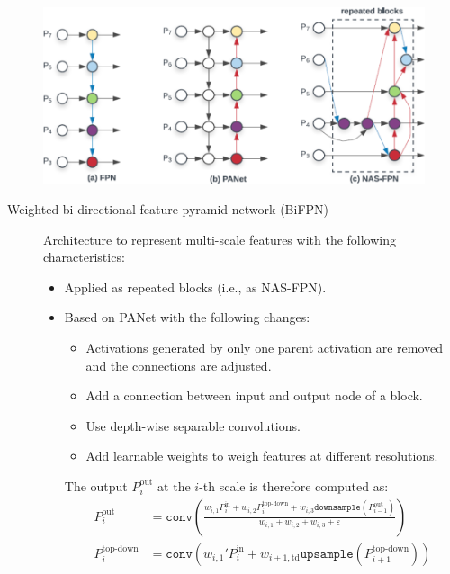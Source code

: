 \begin{subappendices}
\begin{description}
\begin{remark}
                    \begin{figure}[H]
                        \centering
                        \includegraphics[width=0.65\linewidth]{./img/multiscale_comparison.png}
                    \end{figure}
                \end{remark}

                \begin{description}
                    \item[Weighted bi-directional feature pyramid network (BiFPN)] 
                        Architecture to represent multi-scale features with the following characteristics:
                        \begin{itemize}
                            \item Applied as repeated blocks (i.e., as NAS-FPN).
                            \item Based on PANet with the following changes:
                            \begin{itemize}
                                \item Activations generated by only one parent activation are removed and the connections are adjusted.
                                \item Add a connection between input and output node of a block.
                                \item Use depth-wise separable convolutions.
                                \item Add learnable weights to weigh features at different resolutions. 
                            \end{itemize}
                            The output $P_i^\text{out}$ at the $i$-th scale is therefore computed as:
                            \[ 
                                \begin{split}
                                    P_i^\text{out} &= \texttt{conv}\left( \frac{w_{i, 1} P_i^\text{in} + w_{i, 2} P_i^\text{top-down} + w_{i, 3} \texttt{downsample}(P_{i-1}^\text{out})}{w_{i, 1} + w_{i, 2} + w_{i, 3} + \varepsilon} \right) \\
                                    P_i^\text{top-down} &= \texttt{conv}\left( w_{i, 1}' P_i^\text{in} + w_{i+1, \text{td}} \texttt{upsample}(P_{i+1}^\text{top-down}) \right)
                                \end{split}
                            \]


\end{itemize}
\end{description}
\end{description}
\end{subappendices}
